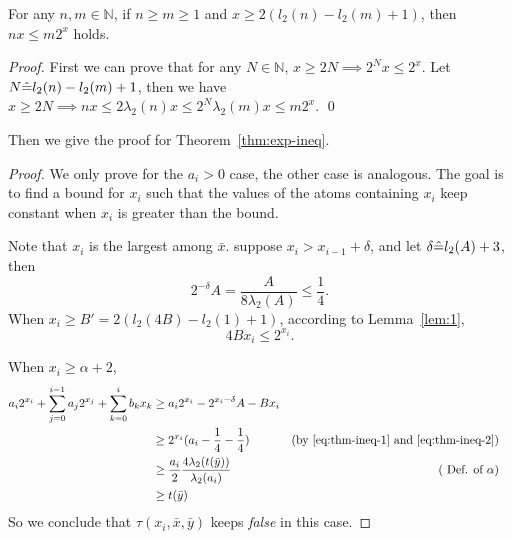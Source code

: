 \begin{lemma} \label{lem:1}
For any $n,m\in \mathbb{N}$, if $n\ge m\ge 1$ and $x\ge 2(l_2(n)-l_2(m)+1)$, then 
$nx\le m2^x$ holds.
\end{lemma}

\begin{proof}
First we can prove that for any $N\in \mathbb{N}$, $x\ge 2N \implies 2^N x\le 2^x$. Let $N\hat{=} l_2(n)-l_2(m)+1$, then we have $x\ge  2N \implies n x\le 2\lambda_2(n) x\le 2^N \lambda_2(m) x \le m 2^x $. \qed 
\end{proof}


Then we give the proof for Theorem~\ref{thm:exp-ineq}.
\begin{proof}
We only prove for the $a_i > 0$ case, the other case is analogous. 
The goal is to find a bound for $x_i$ such that 
the values of the atoms containing $x_i$ keep constant when $x_i$ is greater than the bound.

Note that $x_i$ is the largest among $\bar{x}$. 
suppose $x_i > x_{i-1} + \delta$, and let 
 $\delta \hat{=}  l_2(A)+3$, then 
 \begin{equation} 
   2^{-\delta}A = \frac{A}{8\lambda_2(A)}\le \frac{1}{4}.   \label{eq:thm-ineq-1}
 \end{equation}
 When $x_i \ge B' = 2(l_2(4B)-l_2(1)+1)$, according to Lemma~\ref{lem:1}, 
\begin{equation} 
    4 B x_i \le 2^{x_i}. \label{eq:thm-ineq-2}
\end{equation}
 
When $x_i \ge \alpha+2$,
\begin{align}
    a_i2^{x_i}+ \sum_{j=0}^{i-1} a_j 2^{x_j} + \sum_{k=0}^{i} b_k x_k 
    & \ge a_i 2^{x_i} - 2^{x_i -\delta}A  - Bx_i & \notag \\
     & \ge 2^{x_i}(a_i -\frac{1}{4} -\frac{1}{4}) &  (\mbox{by \eqref{eq:thm-ineq-1} and  \eqref{eq:thm-ineq-2}})\notag \\
    & \ge  \frac{a_i}{2}\frac{4\lambda_2(t(\bar{y}))}{\lambda_2(a_i)} & 
      (\mbox{ Def. of } \alpha) & \notag \\
     & \ge  t(\bar{y}) & \notag 
\end{align}
So we conclude that %
$\tau(x_i,\bar{x},\bar{y})$ keeps \textit{false} in this case.


\end{proof}

